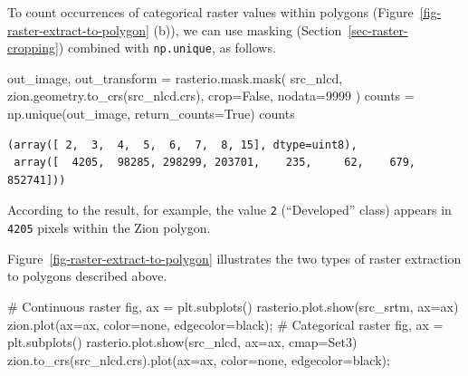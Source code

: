 \documentclass[
  letterpaper,
]{krantz}
\newenvironment{Shaded}{\begin{snugshade}}{\end{snugshade}}
\newcommand{\CommentTok}[1]{\textcolor[rgb]{0.37,0.37,0.37}{#1}}
\newcommand{\DecValTok}[1]{\textcolor[rgb]{0.68,0.00,0.00}{#1}}
\newcommand{\NormalTok}[1]{\textcolor[rgb]{0.00,0.23,0.31}{#1}}
\newcommand{\OperatorTok}[1]{\textcolor[rgb]{0.37,0.37,0.37}{#1}}
\newcommand{\StringTok}[1]{\textcolor[rgb]{0.13,0.47,0.30}{#1}}
\newcommand{\VariableTok}[1]{\textcolor[rgb]{0.07,0.07,0.07}{#1}}
\begin{document}
To count occurrences of categorical raster values within polygons
(Figure~\ref{fig-raster-extract-to-polygon} (b)), we can use masking
(Section~\ref{sec-raster-cropping}) combined with \texttt{np.unique}, as
follows.

\begin{Shaded}
\begin{Highlighting}[]
\NormalTok{out\_image, out\_transform }\OperatorTok{=}\NormalTok{ rasterio.mask.mask(}
\NormalTok{    src\_nlcd, }
\NormalTok{    zion.geometry.to\_crs(src\_nlcd.crs), }
\NormalTok{    crop}\OperatorTok{=}\VariableTok{False}\NormalTok{, }
\NormalTok{    nodata}\OperatorTok{=}\DecValTok{9999}
\NormalTok{)}
\NormalTok{counts }\OperatorTok{=}\NormalTok{ np.unique(out\_image, return\_counts}\OperatorTok{=}\VariableTok{True}\NormalTok{)}
\NormalTok{counts}
\end{Highlighting}
\end{Shaded}

\begin{verbatim}
(array([ 2,  3,  4,  5,  6,  7,  8, 15], dtype=uint8),
 array([  4205,  98285, 298299, 203701,    235,     62,    679, 852741]))
\end{verbatim}

According to the result, for example, the value \texttt{2}
(``Developed'' class) appears in \texttt{4205} pixels within the Zion
polygon.

Figure~\ref{fig-raster-extract-to-polygon} illustrates the two types of
raster extraction to polygons described above.

\begin{Shaded}
\begin{Highlighting}[]
\CommentTok{\# Continuous raster}
\NormalTok{fig, ax }\OperatorTok{=}\NormalTok{ plt.subplots()}
\NormalTok{rasterio.plot.show(src\_srtm, ax}\OperatorTok{=}\NormalTok{ax)}
\NormalTok{zion.plot(ax}\OperatorTok{=}\NormalTok{ax, color}\OperatorTok{=}\StringTok{\textquotesingle{}none\textquotesingle{}}\NormalTok{, edgecolor}\OperatorTok{=}\StringTok{\textquotesingle{}black\textquotesingle{}}\NormalTok{)}\OperatorTok{;}
\CommentTok{\# Categorical raster}
\NormalTok{fig, ax }\OperatorTok{=}\NormalTok{ plt.subplots()}
\NormalTok{rasterio.plot.show(src\_nlcd, ax}\OperatorTok{=}\NormalTok{ax, cmap}\OperatorTok{=}\StringTok{\textquotesingle{}Set3\textquotesingle{}}\NormalTok{)}
\NormalTok{zion.to\_crs(src\_nlcd.crs).plot(ax}\OperatorTok{=}\NormalTok{ax, color}\OperatorTok{=}\StringTok{\textquotesingle{}none\textquotesingle{}}\NormalTok{, edgecolor}\OperatorTok{=}\StringTok{\textquotesingle{}black\textquotesingle{}}\NormalTok{)}\OperatorTok{;}
\end{Highlighting}
\end{Shaded}
\end{document}
